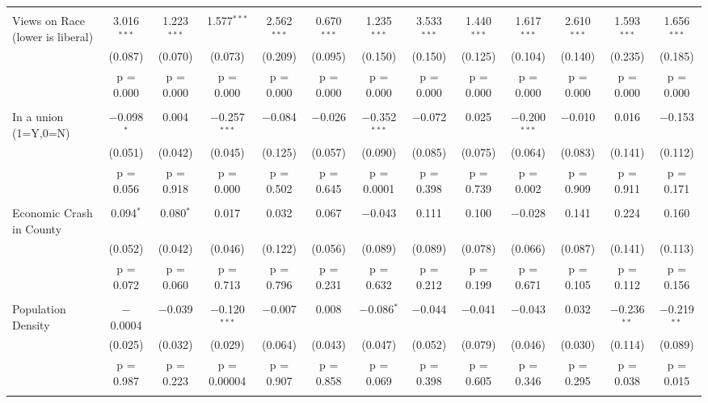 \documentclass{article}
\begin{document}
\begin{landscape}
\begin{longtable}{@{\extracolsep{5pt}}lcccccccccccc}
  & & & & & & & & & & & & \\ 
 Views on Race (lower is liberal) & 3.016$^{***}$ & 1.223$^{***}$ & 1.577$^{***}$ & 2.562$^{***}$ & 0.670$^{***}$ & 1.235$^{***}$ & 3.533$^{***}$ & 1.440$^{***}$ & 1.617$^{***}$ & 2.610$^{***}$ & 1.593$^{***}$ & 1.656$^{***}$ \\ 
  & (0.087) & (0.070) & (0.073) & (0.209) & (0.095) & (0.150) & (0.150) & (0.125) & (0.104) & (0.140) & (0.235) & (0.185) \\ 
  & p = 0.000 & p = 0.000 & p = 0.000 & p = 0.000 & p = 0.000 & p = 0.000 & p = 0.000 & p = 0.000 & p = 0.000 & p = 0.000 & p = 0.000 & p = 0.000 \\ 
  & & & & & & & & & & & & \\ 
 In a union (1=Y,0=N) & $-$0.098$^{*}$ & 0.004 & $-$0.257$^{***}$ & $-$0.084 & $-$0.026 & $-$0.352$^{***}$ & $-$0.072 & 0.025 & $-$0.200$^{***}$ & $-$0.010 & 0.016 & $-$0.153 \\ 
  & (0.051) & (0.042) & (0.045) & (0.125) & (0.057) & (0.090) & (0.085) & (0.075) & (0.064) & (0.083) & (0.141) & (0.112) \\ 
  & p = 0.056 & p = 0.918 & p = 0.000 & p = 0.502 & p = 0.645 & p = 0.0001 & p = 0.398 & p = 0.739 & p = 0.002 & p = 0.909 & p = 0.911 & p = 0.171 \\ 
  & & & & & & & & & & & & \\ 
 Economic Crash in County & 0.094$^{*}$ & 0.080$^{*}$ & 0.017 & 0.032 & 0.067 & $-$0.043 & 0.111 & 0.100 & $-$0.028 & 0.141 & 0.224 & 0.160 \\ 
  & (0.052) & (0.042) & (0.046) & (0.122) & (0.056) & (0.089) & (0.089) & (0.078) & (0.066) & (0.087) & (0.141) & (0.113) \\ 
  & p = 0.072 & p = 0.060 & p = 0.713 & p = 0.796 & p = 0.231 & p = 0.632 & p = 0.212 & p = 0.199 & p = 0.671 & p = 0.105 & p = 0.112 & p = 0.156 \\ 
  & & & & & & & & & & & & \\ 
 Population Density & $-$0.0004 & $-$0.039 & $-$0.120$^{***}$ & $-$0.007 & 0.008 & $-$0.086$^{*}$ & $-$0.044 & $-$0.041 & $-$0.043 & 0.032 & $-$0.236$^{**}$ & $-$0.219$^{**}$ \\ 
  & (0.025) & (0.032) & (0.029) & (0.064) & (0.043) & (0.047) & (0.052) & (0.079) & (0.046) & (0.030) & (0.114) & (0.089) \\ 
  & p = 0.987 & p = 0.223 & p = 0.00004 & p = 0.907 & p = 0.858 & p = 0.069 & p = 0.398 & p = 0.605 & p = 0.346 & p = 0.295 & p = 0.038 & p = 0.015 \\ 
  & & & & & & & & & & & & \\ 

\end{longtable}
\end{landscape}
\end{document}
